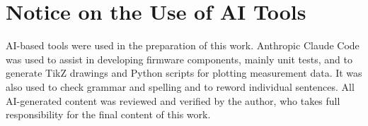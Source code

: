 
\chapter*{Notice on the Use of AI Tools}

AI-based tools were used in the preparation of this work. Anthropic Claude Code \cite{anthropic2026claudecode} was used to assist in developing firmware components, mainly unit tests, and to generate TikZ drawings and Python scripts for plotting measurement data. It was also used to check grammar and spelling and to reword individual sentences. All AI-generated content was reviewed and verified by the author, who takes full responsibility for the final content of this work.
